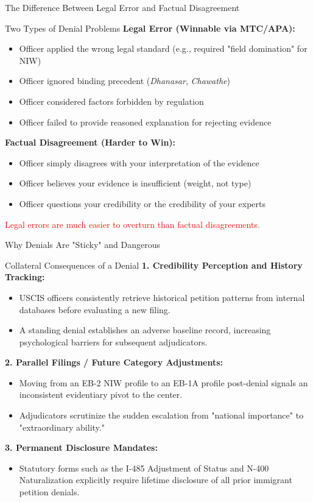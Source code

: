 \documentclass[11pt]{beamer}
\begin{document}
	\begin{frame}{The Difference Between Legal Error and Factual Disagreement}
		\scriptsize
		\begin{block}{Two Types of Denial Problems}
			\textbf{Legal Error (Winnable via MTC/APA):}
			\begin{itemize}
				\item Officer applied the wrong legal standard (e.g., required "field domination" for NIW)
				\item Officer ignored binding precedent (\textit{Dhanasar}, \textit{Chawathe})
				\item Officer considered factors forbidden by regulation
				\item Officer failed to provide reasoned explanation for rejecting evidence
			\end{itemize}
			\textbf{Factual Disagreement (Harder to Win):}
			\begin{itemize}
				\item Officer simply disagrees with your interpretation of the evidence
				\item Officer believes your evidence is insufficient (weight, not type)
				\item Officer questions your credibility or the credibility of your experts
			\end{itemize}
			\textcolor{red}{Legal errors are much easier to overturn than factual disagreements.}
		\end{block}
	\end{frame}
	
	\begin{frame}{Why Denials Are "Sticky" and Dangerous}
		\scriptsize
		\begin{block}{Collateral Consequences of a Denial}
			\textbf{1. Credibility Perception and History Tracking:}
			\begin{itemize}
				\item USCIS officers consistently retrieve historical petition patterns from internal databases before evaluating a new filing.
				\item A standing denial establishes an adverse baseline record, increasing psychological barriers for subsequent adjudicators.
			\end{itemize}
			\textbf{2. Parallel Filings / Future Category Adjustments:}
			\begin{itemize}
				\item Moving from an EB-2 NIW profile to an EB-1A profile post-denial signals an inconsistent evidentiary pivot to the center.
				\item Adjudicators scrutinize the sudden escalation from "national importance" to "extraordinary ability."
			\end{itemize}
			\textbf{3. Permanent Disclosure Mandates:}
			\begin{itemize}
				\item Statutory forms such as the I-485 Adjustment of Status and N-400 Naturalization explicitly require lifetime disclosure of all prior immigrant petition denials.
			\end{itemize}
		\end{block}
	\end{frame}
	
\end{document}
